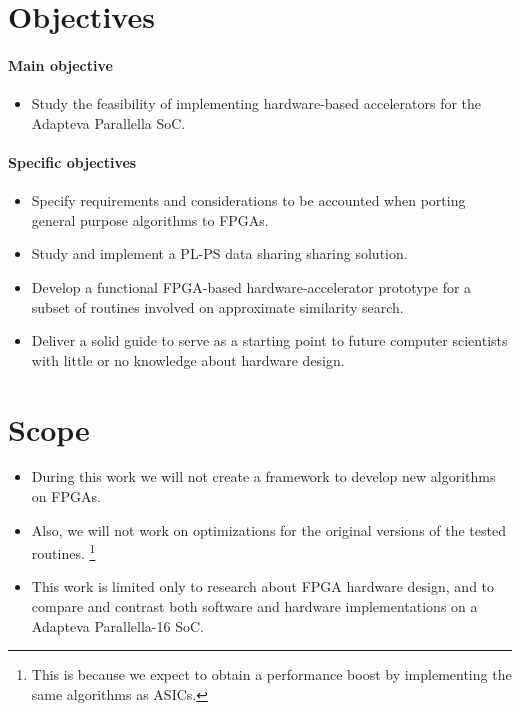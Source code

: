 \documentclass[11pt,letterpaper]{article}
\begin{document}
\section{Objectives}
\paragraph{Main objective}
\begin{itemize}
\item Study the feasibility of implementing hardware-based accelerators for the Adapteva Parallella SoC.
\end{itemize}

\paragraph{Specific objectives}
\begin{itemize}
    \item Specify requirements and considerations to be accounted when porting general purpose algorithms to FPGAs.
    \item Study and implement a PL-PS data sharing sharing solution.
    \item Develop a functional FPGA-based hardware-accelerator prototype for a subset of routines involved 
    on approximate similarity search.
    \item Deliver a solid guide to serve as a starting point to future computer scientists with little or no 
    knowledge about hardware design. 
\end{itemize}



\section{Scope}
\begin{itemize}
    \item During this work we will not create a framework to develop new algorithms on FPGAs. 
    \item Also, we will not work on optimizations for the original versions of the tested routines.
    \footnote{This is because we expect to obtain a performance boost by implementing the same algorithms as ASICs.}
    \item This work is limited only to research about FPGA hardware design, and to compare and contrast both 
        software and hardware implementations on a Adapteva Parallella-16 SoC.
\end{itemize}
\end{document}
